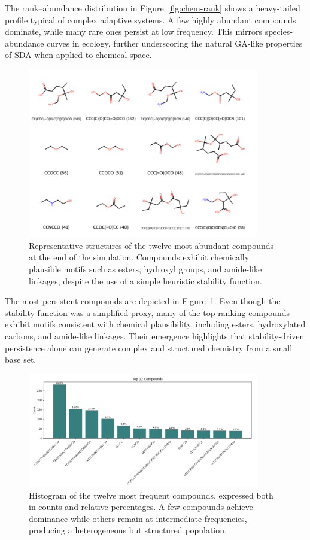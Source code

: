 \documentclass[life,article,submit,pdftex,moreauthors]{Definitions/mdpi}
\begin{document}
The rank–abundance distribution in Figure~\ref{fig:chem-rank} shows a heavy-tailed profile typical of complex adaptive systems. A few highly abundant compounds dominate, while many rare ones persist at low frequency. This mirrors species-abundance curves in ecology, further underscoring the natural GA-like properties of SDA when applied to chemical space.  

\begin{figure}[H]
    \centering
    \includegraphics[width=0.9\textwidth]{SDA-chem-compounds.png}
    \caption{Representative structures of the twelve most abundant compounds at the end of the simulation. Compounds exhibit chemically plausible motifs such as esters, hydroxyl groups, and amide-like linkages, despite the use of a simple heuristic stability function.}
    \label{fig:chem-compounds}
\end{figure}

The most persistent compounds are depicted in Figure~\ref{fig:chem-compounds}. Even though the stability function was a simplified proxy, many of the top-ranking compounds exhibit motifs consistent with chemical plausibility, including esters, hydroxylated carbons, and amide-like linkages. Their emergence highlights that stability-driven persistence alone can generate complex and structured chemistry from a small base set.  

\begin{figure}[H]
    \centering
    \includegraphics[width=0.9\textwidth]{SDA-chem-compound-hist.png}
    \caption{Histogram of the twelve most frequent compounds, expressed both in counts and relative percentages. A few compounds achieve dominance while others remain at intermediate frequencies, producing a heterogeneous but structured population.}
    \label{fig:chem-compound-hist}
\end{figure}
\end{document}
